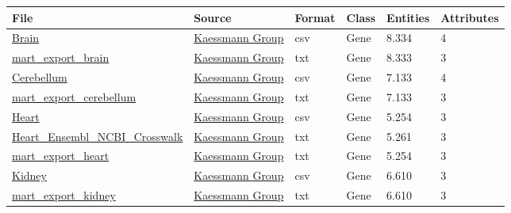 \begin{table}[!ht]
\centering
\setlength\extrarowheight{2pt} %
\begin{footnotesize}
\begin{tabularx}{\textwidth}{|l|l|l|l|l|l|}
\hline
\textbf{File} & \textbf{Source} & \textbf{Format} & \textbf{Class} & \textbf{Entities} & \textbf{Attributes} & \\ \hline

	\href{https://nahorgebre.s3.amazonaws.com/Brain.csv}{Brain} & \href{https://www.zmbh.uni-heidelberg.de/kaessmann/}{Kaessmann Group}  & csv & Gene & 8.334 & 4 \\
	
	\href{https://nahorgebre.s3.amazonaws.com/mart_export_brain.txt}{mart\_export\_brain} & \href{https://www.zmbh.uni-heidelberg.de/kaessmann/}{Kaessmann Group} & txt & Gene & 8.333 & 3 \\
	
	\href{https://nahorgebre.s3.amazonaws.com/Cerebellum.csv}{Cerebellum} & \href{https://www.zmbh.uni-heidelberg.de/kaessmann/}{Kaessmann Group}  & csv & Gene & 7.133 & 4 \\
	
	\href{https://nahorgebre.s3.amazonaws.com/mart_export_cerebellum.txt}{mart\_export\_cerebellum} & \href{https://www.zmbh.uni-heidelberg.de/kaessmann/}{Kaessmann Group} & txt & Gene & 7.133 & 3 \\
	
	\href{https://nahorgebre.s3.amazonaws.com/Heart.csv}{Heart} & \href{https://www.zmbh.uni-heidelberg.de/kaessmann/}{Kaessmann Group}  & csv & Gene & 5.254 & 3 \\
	
	\href{https://nahorgebre.s3.amazonaws.com/Heart_Ensembl_NCBI_Crosswalk.txt}{Heart\_Ensembl\_NCBI\_Crosswalk} & \href{https://www.zmbh.uni-heidelberg.de/kaessmann/}{Kaessmann Group} & txt & Gene & 5.261 & 3 \\
	
	\href{https://nahorgebre.s3.amazonaws.com/mart_export_heart.txt}{mart\_export\_heart} & \href{https://www.zmbh.uni-heidelberg.de/kaessmann/}{Kaessmann Group} & txt & Gene & 5.254 & 3 \\
	
	\href{https://nahorgebre.s3.amazonaws.com/Kidney.csv}{Kidney} & \href{https://www.zmbh.uni-heidelberg.de/kaessmann/}{Kaessmann Group}  & csv & Gene & 6.610 & 3 \\
	
	\href{https://nahorgebre.s3.amazonaws.com/mart_export_kidney.txt}{mart\_export\_kidney} & \href{https://www.zmbh.uni-heidelberg.de/kaessmann/}{Kaessmann Group} & txt & Gene & 6.610 & 3 \\
	

\end{tabularx}
\end{footnotesize}
\end{table}
